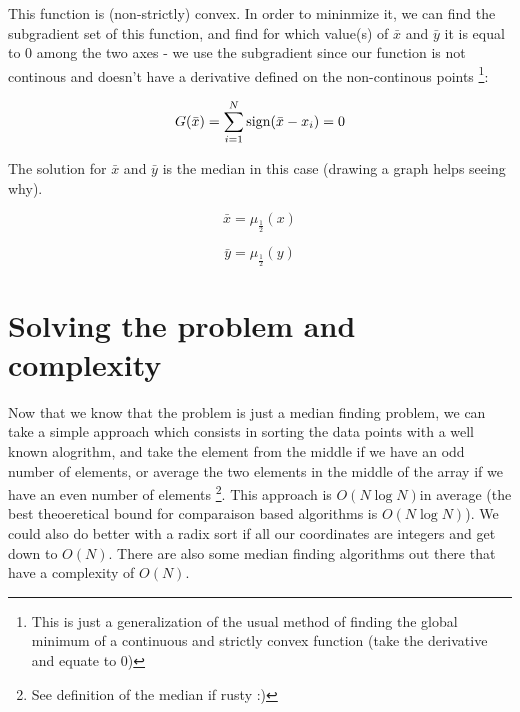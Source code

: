 \documentclass[english]{article}
\begin{document}
This function is (non-strictly) convex. In order to mininmize it,
we can find the subgradient set of this function, and find for which
value(s) of $\bar{x}$ and $\bar{y}$ it is equal to $0$ among the
two axes - we use the subgradient since our function is not continous
and doesn't have a derivative defined on the non-continous points%
\footnote{This is just a generalization of the usual method of finding the global
minimum of a continuous and strictly convex function (take the derivative and equate to 0)%
}:

\[
G(\bar{x})=\sum_{i=1}^{N}\mbox{sign}(\mbox{\ensuremath{\bar{x}}}-x_{i})=0
\]


The solution for $\bar{x}$ and $\bar{y}$ is the median in this case
(drawing a graph helps seeing why).

\[
\bar{x}=\mu_{\frac{1}{2}}(x)
\]


\[
\bar{y}=\mu_{\frac{1}{2}}(y)
\]



\section{Solving the problem and complexity}

Now that we know that the problem is just a median finding problem,
we can take a simple approach which consists in sorting the data points
with a well known alogrithm, and take the element from the middle
if we have an odd number of elements, or average the two elements
in the middle of the array if we have an even number of elements%
\footnote{See definition of the median if rusty :)%
}. This approach is $O(N\log N)$in average (the best theoeretical
bound for comparaison based algorithms is $O(N\log N)$). We could
also do better with a radix sort if all our coordinates are integers
and get down to $O(N)$. There are also some median finding algorithms
out there that have a complexity of $O(N)$.
\end{document}
